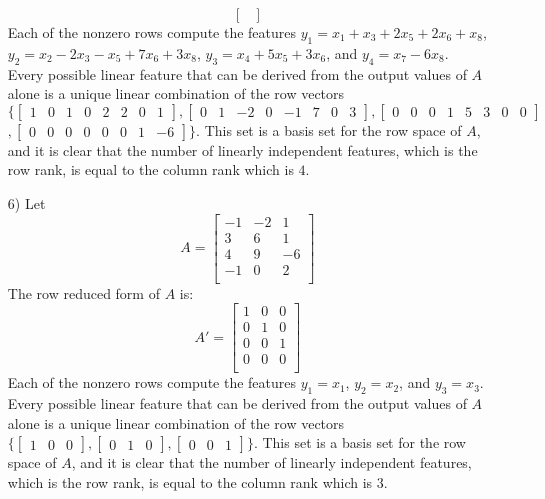 \documentclass{article}
\begin{document}
\begin{itemize}
\[\begin{bmatrix}
\end{bmatrix}\]
Each of the nonzero rows compute the features \(y_1 = x_1 + x_3 + 2x_5 + 2x_6 + x_8\), \(y_2 = x_2 - 2x_3 - x_5 + 7x_6 + 3x_8\), \(y_3 = x_4 + 5x_5 + 3x_6\), and \(y_4 = x_7 - 6x_8\). Every possible linear feature that can be derived from the output values of \(A\) alone is a unique linear combination of the row vectors \(\{\begin{bmatrix} 1 & 0 & 1 & 0 & 2 & 2 & 0 & 1 \end{bmatrix}, \begin{bmatrix} 0 & 1 & -2 & 0 & -1 & 7 & 0 & 3 \end{bmatrix}, \begin{bmatrix} 0 & 0 & 0 & 1 & 5 & 3 & 0 & 0 \end{bmatrix}\) \\ \(, \begin{bmatrix} 0 & 0 & 0 & 0 & 0 & 0 & 1 & -6 \end{bmatrix}\}\). This set is a basis set for the row space of \(A\), and it is clear that the number of linearly independent features, which is the row rank, is equal to the column rank which is \(4\).
\item[6)] Let \[A = \begin{bmatrix}
-1 & -2 &  1 \\
 3 &  6 &  1 \\
 4 &  9 & -6 \\
-1 &  0 &  2 \\ 
\end{bmatrix}\]
The row reduced form of \(A\) is: 
\[A' = \begin{bmatrix}
1 & 0 & 0 \\
0 & 1 & 0 \\
0 & 0 & 1 \\
0 & 0 & 0 \\ 
\end{bmatrix}\]
Each of the nonzero rows compute the features \(y_1 = x_1\), \(y_2 = x_2\), and \(y_3 = x_3\). Every possible linear feature that can be derived from the output values of \(A\) alone is a unique linear combination of the row vectors \(\{\begin{bmatrix} 1 & 0 & 0 \end{bmatrix}, \begin{bmatrix} 0 & 1 & 0 \end{bmatrix}, \begin{bmatrix} 0 & 0 & 1 \end{bmatrix}\}\). This set is a basis set for the row space of \(A\), and it is clear that the number of linearly independent features, which is the row rank, is equal to the column rank which is \(3\).

\end{itemize}
\end{document}
